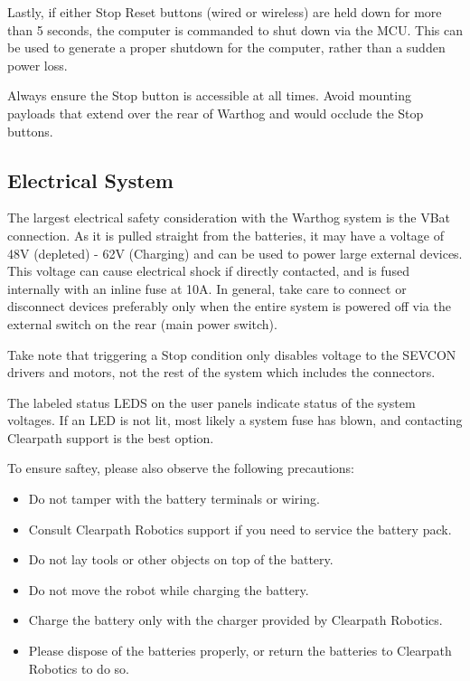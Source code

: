 \documentclass[]{clearpath-latex/clearpath-manual}
\begin{document}
Lastly, if either Stop Reset buttons (wired or wireless) are held down for more than 5 seconds, the computer is commanded to shut down via the MCU. This can be used to generate a proper shutdown for the computer, rather than a sudden power loss.

Always ensure the Stop button is accessible at all times. Avoid mounting payloads that extend over the rear of Warthog and would occlude the Stop buttons.

\subsection{Electrical System}

The largest electrical safety consideration with the Warthog system is the VBat connection. As it is pulled straight from the batteries, it may have a voltage of 48V (depleted) - 62V (Charging) and can be used to power large external devices. This voltage can cause electrical shock if directly contacted, and is fused internally with an inline fuse at 10A. In general, take care to connect or disconnect devices preferably only when the entire system is powered off via the external switch on the rear (main power switch).

Take note that triggering a Stop condition only disables voltage to the SEVCON drivers and motors, not the rest of the system which includes the connectors. 

The labeled status LEDS on the user panels indicate status of the system voltages. If an LED is not lit, most likely a system fuse has blown, and contacting Clearpath support is the best option.

To ensure saftey, please also observe the following precautions:

\begin{itemize}[nolistsep]
  \item Do not tamper with the battery terminals or wiring.
  \item Consult Clearpath Robotics support if you need to service the battery pack.
  \item Do not lay tools or other objects on top of the battery.
  \item Do not move the robot while charging the battery.
  \item Charge the battery only with the charger provided by Clearpath Robotics.
  \item Please dispose of the batteries properly, or return the batteries to Clearpath Robotics to do so.
\end{itemize}
\end{document}
